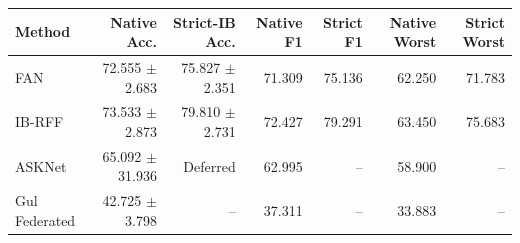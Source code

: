 \begin{tabular}{lrrrrrr}
\toprule Method & Native Acc. & Strict-IB Acc. & Native F1 & Strict F1 & Native Worst & Strict Worst\\
\midrule
FAN & 72.555 $\pm$ 2.683 & 75.827 $\pm$ 2.351 & 71.309 & 75.136 & 62.250 & 71.783\\
IB-RFF & 73.533 $\pm$ 2.873 & 79.810 $\pm$ 2.731 & 72.427 & 79.291 & 63.450 & 75.683\\
ASKNet & 65.092 $\pm$ 31.936 & Deferred & 62.995 & -- & 58.900 & --\\
Gul Federated & 42.725 $\pm$ 3.798 & -- & 37.311 & -- & 33.883 & --\\
\bottomrule
\end{tabular}
